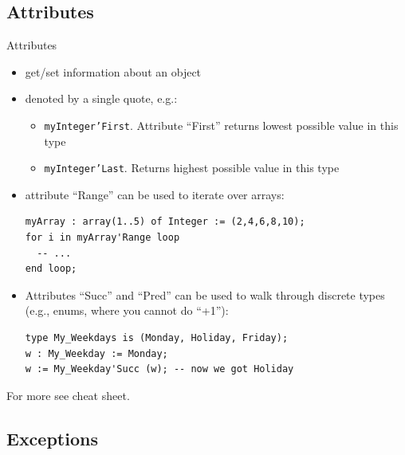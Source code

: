 
\subsection{Attributes}

\begin{frame}[fragile]{Attributes}  
  \small
  \vspace{-.5em}
  \begin{itemize}
  \item get/set information about an object
  \item denoted by a single quote, e.g.:
    \begin{itemize}
    \item \texttt{myInteger'First}. Attribute ``First'' returns lowest possible value in this type
    \item \texttt{myInteger'Last}. Returns highest possible value in this type
    \end{itemize}

  \item attribute ``Range'' can be used to iterate over arrays:
    {\scriptsize
\begin{lstlisting}
myArray : array(1..5) of Integer := (2,4,6,8,10);
for i in myArray'Range loop
  -- ...
end loop;
\end{lstlisting}
    }

  \item Attributes ``Succ'' and ``Pred'' can be used to walk through discrete types (e.g., enums, where you cannot do ``+1''):
    {\footnotesize
\begin{lstlisting}
type My_Weekdays is (Monday, Holiday, Friday);
w : My_Weekday := Monday;
w := My_Weekday'Succ (w); -- now we got Holiday
\end{lstlisting}
    }
  \end{itemize}
  {\scriptsize For more see cheat sheet.}

\end{frame}
\addtocounter{clock}{2}

\subsection{Exceptions}

